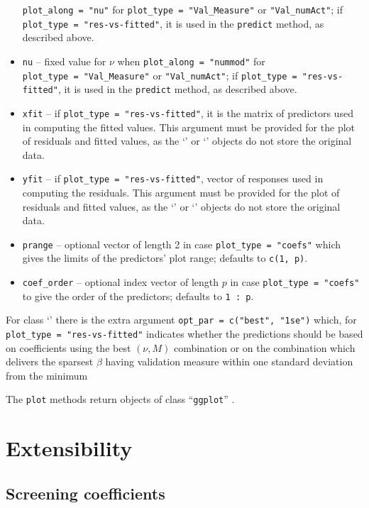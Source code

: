 \documentclass[
  article]{jss}
\newcommand{\class}[1]{`\code{#1}'}
\begin{document}
\begin{itemize}
  \texttt{plot\_along\ =\ "nu"} for
  \texttt{plot\_type\ =\ "Val\_Measure"} or \texttt{"Val\_numAct"}; if
  \texttt{plot\_type\ =\ "res-vs-fitted"}, it is used in the
  \texttt{predict} method, as described above.
\item
  \texttt{nu} -- fixed value for \(\nu\) when
  \texttt{plot\_along\ =\ "nummod"} for
  \texttt{plot\_type\ =\ "Val\_Measure"} or \texttt{"Val\_numAct"}; if
  \texttt{plot\_type\ =\ "res-vs-fitted"}, it is used in the
  \texttt{predict} method, as described above.
\item
  \texttt{xfit} -- if \texttt{plot\_type\ =\ "res-vs-fitted"}, it is the
  matrix of predictors used in computing the fitted values. This
  argument must be provided for the plot of residuals and fitted values,
  as the \class{spar} or \class{spar.cv} objects do not store the
  original data.
\item
  \texttt{yfit} -- if \texttt{plot\_type\ =\ "res-vs-fitted"}, vector of
  responses used in computing the residuals. This argument must be
  provided for the plot of residuals and fitted values, as the
  \class{spar} or \class{spar.cv} objects do not store the original
  data.
\item
  \texttt{prange} -- optional vector of length 2 in case
  \texttt{plot\_type\ =\ "coefs"} which gives the limits of the
  predictors' plot range; defaults to \texttt{c(1,\ p)}.
\item
  \texttt{coef\_order} -- optional index vector of length \(p\) in case
  \texttt{plot\_type\ =\ "coefs"} to give the order of the predictors;
  defaults to \texttt{1\ :\ p}.
\end{itemize}

For class \class{spar.cv} there is the extra argument
\texttt{opt\_par\ =\ c("best",\ "1se")} which, for
\texttt{plot\_type\ =\ "res-vs-fitted"} indicates whether the
predictions should be based on coefficients using the best \((\nu, M)\)
combination or on the combination which delivers the sparsest \(\beta\)
having validation measure within one standard deviation from the minimum

The \texttt{plot} methods return objects of class ``\texttt{ggplot}''
\citep{ggplotR}.

\section{Extensibility}\label{sec-extensibility}

\subsection{Screening coefficients}\label{sec-extensscrcoef}
\end{document}
